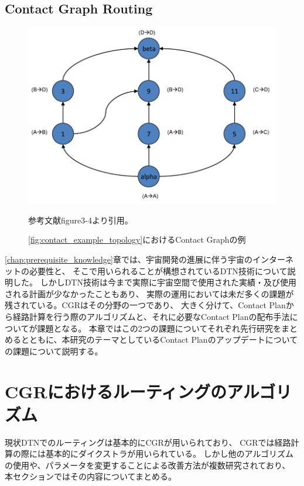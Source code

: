 \subsection{Contact Graph Routing}
\label{subsection:Contact Graph Routing}

\begin{figure}[tbh]
    \centering
    \includegraphics[width=0.5\textheight]{img/contact_example_contactgraph.pdf}
    \caption{\ref{fig:contact_example_topology}におけるContact Graphの例}
    \label{fig:contact_example_contactgraph}
    \begin{minipage}{\textwidth}
        \centering
        \vspace{3mm}
        参考文献\cite{schedule_aware_bundle_routing}figure3-4より引用。
    \end{minipage}
\end{figure}
\label{chap:related_works}
\ref{chap:prerequisite_knowledge}章では、宇宙開発の進展に伴う宇宙のインターネットの必要性と、
そこで用いられることが構想されているDTN技術について説明した。
しかしDTN技術は今まで実際に宇宙空間で使用された実績・及び使用される計画が少なかったこともあり、
実際の運用においては未だ多くの課題が残されている。CGRはその分野の一つであり、
大きく分けて、Contact Planから経路計算を行う際のアルゴリズムと、それに必要なContact Planの配布手法についてが課題となる。
本章ではこの2つの課題についてそれぞれ先行研究をまとめるとともに、本研究のテーマとしているContact Planのアップデートについての課題について説明する。

\section{CGRにおけるルーティングのアルゴリズム}
\label{sec:宇宙インターネットにおけるルーティングのアルゴリズム}    
現状DTNでのルーティングは基本的にCGRが用いられており、
CGRでは経路計算の際には基本的にダイクストラが用いられている。
しかし他のアルゴリズムの使用や、パラメータを変更することによる改善方法が複数研究されており、
本セクションではその内容についてまとめる。
